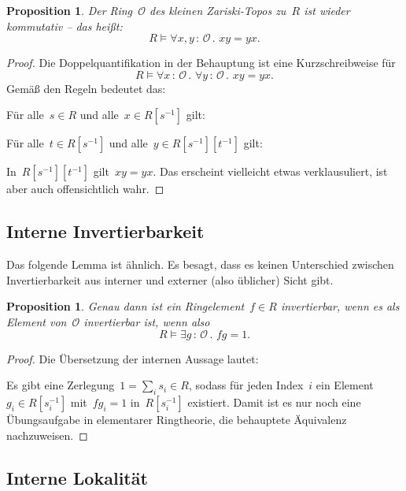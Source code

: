 \documentclass[a4paper,ngerman,12pt]{scrartcl}
\theoremstyle{definition}
\theoremstyle{plain}
\newtheorem{prop}[defn]{Proposition}
\theoremstyle{remark}
\renewcommand{\O}{\mathcal{O}}
\renewcommand{\_}{\mathpunct{.}\,}
\newcommand{\?}{\,{:}\,}
\newenvironment{indentblock}{%
  \list{}{\leftmargin\leftmargin}%
  \item\relax
}{%
  \endlist
}
\begin{document}
\begin{prop}Der Ring~$\O$ des kleinen Zariski-Topos zu~$R$ ist wieder
kommutativ -- das heißt:
\[ R \models \forall x,y \? \O\_ x y = y x. \]
\end{prop}
\begin{proof}Die Doppelquantifikation in der Behauptung ist eine
Kurzschreibweise für
\[ R \models \forall x\?\O\_ \forall y\?\O\_ x y = y x. \]
Gemäß den Regeln bedeutet das:
\begin{indentblock}
Für alle~$s \in R$ und alle~$x \in R[s^{-1}]$ gilt:
\begin{indentblock}
Für alle~$t \in R[s^{-1}]$ und alle~$y \in R[s^{-1}][t^{-1}]$ gilt:
\begin{indentblock}
In~$R[s^{-1}][t^{-1}]$ gilt~$xy = yx$.
\end{indentblock}
\end{indentblock}
\end{indentblock}
Das erscheint vielleicht etwas verklausuliert, ist aber auch offensichtlich
wahr.
\end{proof}


\subsection{Interne Invertierbarkeit}

Das folgende Lemma ist ähnlich. Es besagt, dass es keinen Unterschied zwischen
Invertierbarkeit aus interner und externer (also üblicher) Sicht gibt.
\begin{prop}\label{interne-invertierbarkeit}%
Genau dann ist ein Ringelement~$f \in R$ invertierbar, wenn es als Element
von~$\O$ invertierbar ist, wenn also
\[ R \models \exists g\?\O\_ fg = 1. \]
\end{prop}
\begin{proof}
Die Übersetzung der internen Aussage lautet:
\begin{indentblock}
Es gibt eine Zerlegung~$1 = \sum_i s_i \in R$, sodass für jeden Index~$i$ ein
Element $g_i \in R[s_i^{-1}]$ mit~$fg_i = 1$ in~$R[s_i^{-1}]$ existiert.
\end{indentblock}
Damit ist es nur noch eine Übungsaufgabe in elementarer Ringtheorie, die
behauptete Äquivalenz nachzuweisen.
\end{proof}


\subsection{Interne Lokalität}
\end{document}
